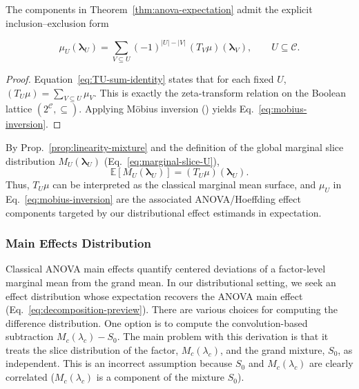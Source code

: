 \begin{corollary}
\label{cor:mobius-form}
The components in Theorem~\ref{thm:anova-expectation} admit the explicit
inclusion--exclusion form

{\small
\begin{equation}
\label{eq:mobius-inversion}
\mu_U(\boldsymbol{\lambda}_U)
=
\sum_{V\subseteq U}
(-1)^{|U|-|V|}
\,(T_V\mu)(\boldsymbol{\lambda}_V),
\qquad U\subseteq\mathcal{C}.
\end{equation}
}

\end{corollary}

\begin{proof}
Equation~\eqref{eq:TU-sum-identity} states that for each fixed $U$,
$(T_U\mu)=\sum_{V\subseteq U}\mu_V$. This is exactly the zeta-transform relation
on the Boolean lattice $(2^{\mathcal{C}},\subseteq)$. Applying M\"obius inversion
(\citealt{rota1964foundations}) yields Eq.~\eqref{eq:mobius-inversion}.
\end{proof}

\begin{remark}
By Prop.~\ref{prop:linearity-mixture} and the definition of the global marginal
slice distribution $M_U(\boldsymbol{\lambda}_U)$ (Eq.~\eqref{eq:marginal-slice-U}),
\[
\mathbb{E}\!\left[M_U(\boldsymbol{\lambda}_U)\right]
=
(T_U\mu)(\boldsymbol{\lambda}_U).
\]
Thus, $T_U\mu$ can be interpreted as the classical marginal mean surface, and
$\mu_U$ in Eq.~\eqref{eq:mobius-inversion} are the associated ANOVA/Hoeffding
effect components targeted by our distributional effect estimands in
expectation.
\end{remark}

\subsubsection{Main Effects Distribution}
\label{app:main-effect-dists}

Classical ANOVA main effects quantify centered deviations of a
factor-level marginal mean from the grand mean. In our distributional setting,
we seek an effect distribution whose expectation recovers the ANOVA main
effect (Eq.~\ref{eq:decomposition-preview}). 
There are various choices for computing the difference distribution. 
One option is to compute the
convolution-based subtraction
$M_c(\lambda_c)-S_0$.
The main problem with this derivation is that it treats the slice distribution of the factor, $M_c(\lambda_c)$, and the grand mixture, $S_0$, as independent. 
This is an incorrect assumption because $S_0$ and $M_c(\lambda_c)$ are clearly
correlated ($M_c(\lambda_c)$ is a component of the mixture $S_0$).

